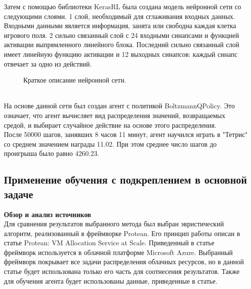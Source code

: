 \documentclass{article}
\begin{document}
Затем с помощью библиотеки KerasRL была создана модель нейронной сети со следующими слоями. 1 слой, необходимый для сглаживания входных данных. Входными данными является информация, занята или свободна каждая клетка игрового поля. 2 сильно связанный слой с 24 входными синапсами и функцией активации выпрямленного линейного блока. Последний сильно связанный слой имеет линейную функцию активации и 12 выходных синапсов: каждый синапс отвечает за одно из действий.\\
\begin{figure}[h]
\caption{Краткое описание нейронной сети.}
\label{ris:image}
\end{figure}\\
На основе данной сети был создан агент с политикой BoltzmannQPolicy. Это означает, что агент вычисляет вид распределения значений, возвращаемых средой, и выбирает случайное действие на основе этого распределения.\\
После 50000 шагов, занявших 8 часов 11 минут, агент научился играть в "Тетрис" со среднем значением награды 11.02. При этом среднее число шагов до проигрыша было равно 4260.23.\\
\newpage
\begin{center}
\item\subsection{Применение обучения с подкреплением в основной задаче}
\end{center}
\textbf{Обзор и анализ источников}\\
Для сравнения результатов выбранного метода был выбран эвристический алгоритм, реализованный в фреймворке Protean. Его принцип работы описан в статье Protean: VM Allocation Service at Scale\cite{litlink21}. Приведенный в статье фреймворк используется в облачной платформе Microsoft Azure. Выбранный фреймворк покрывает все задачи распределения облачных ресурсов, но в данной статье будет использована только его часть для соотнесения результатов. Также для обучения агента будет использованы данные, приведенные в статье\cite{litlink22}.\\
\end{document}
